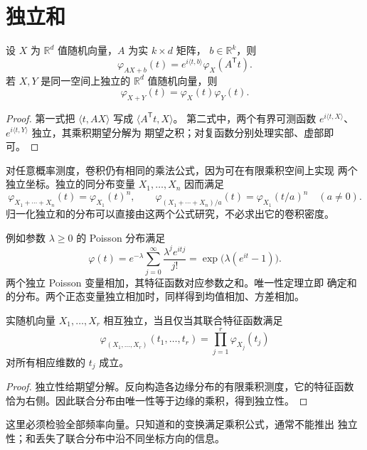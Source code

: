 \section{独立和}
\label{sec:characteristic-independent-sums}

\begin{proposition}
\label{prop:characteristic-linear-convolution}
设 $X$ 为 $\mathbb R^d$ 值随机向量，$A$ 为实 $k\times d$ 矩阵，
$b\in\mathbb R^k$，则
\[
 \varphi_{AX+b}(t)=e^{i\langle t,b\rangle}\varphi_X(A^{\mathsf T}t).
\]
若 $X,Y$ 是同一空间上独立的 $\mathbb R^d$ 值随机向量，则
\[
 \varphi_{X+Y}(t)=\varphi_X(t)\varphi_Y(t).
\]
\end{proposition}

\begin{proof}
第一式把 $\langle t,AX\rangle$ 写成 $\langle A^{\mathsf T}t,X\rangle$。
第二式中，两个有界可测函数
$e^{i\langle t,X\rangle}$、$e^{i\langle t,Y\rangle}$ 独立，其乘积期望分解为
期望之积；对复函数分别处理实部、虚部即可。
\end{proof}

对任意概率测度，卷积仍有相同的乘法公式，因为可在有限乘积空间上实现
两个独立坐标。独立的同分布变量 $X_1,\ldots,X_n$ 因而满足
\[
 \varphi_{X_1+\cdots+X_n}(t)=\varphi_{X_1}(t)^n,
 \qquad
 \varphi_{(X_1+\cdots+X_n)/a}(t)=\varphi_{X_1}(t/a)^n
 \quad(a\ne0).
\]
归一化独立和的分布可以直接由这两个公式研究，不必求出它的卷积密度。

例如参数 $\lambda\ge0$ 的 Poisson 分布满足
\[
 \varphi(t)=e^{-\lambda}\sum_{j=0}^{\infty}\frac{\lambda^j e^{itj}}{j!}
           =\exp\bigl(\lambda(e^{it}-1)\bigr).
\]
两个独立 Poisson 变量相加，其特征函数对应参数之和。唯一性定理立即
确定和的分布。两个正态变量独立相加时，同样得到均值相加、方差相加。

\begin{proposition}[联合特征函数与独立性]
\label{prop:joint-characteristic-independence}
实随机向量 $X_1,\ldots,X_r$ 相互独立，当且仅当其联合特征函数满足
\[
 \varphi_{(X_1,\ldots,X_r)}(t_1,\ldots,t_r)
 =\prod_{j=1}^r\varphi_{X_j}(t_j)
\]
对所有相应维数的 $t_j$ 成立。
\end{proposition}

\begin{proof}
独立性给期望分解。反向构造各边缘分布的有限乘积测度，它的特征函数
恰为右侧。因此联合分布由唯一性等于边缘的乘积，得到独立性。
\end{proof}

这里必须检验全部频率向量。只知道和的变换满足乘积公式，通常不能推出
独立性；和丢失了联合分布中沿不同坐标方向的信息。


